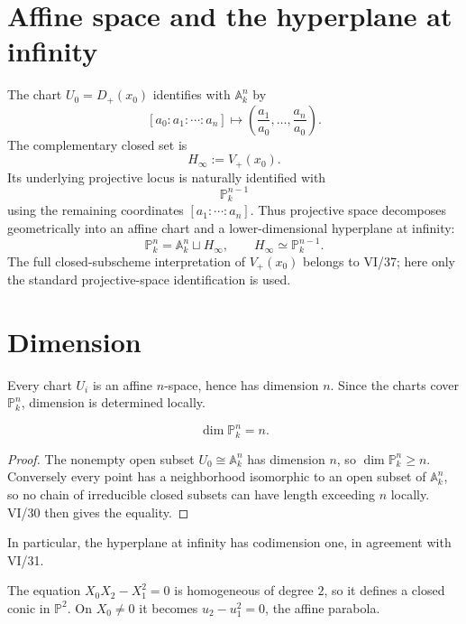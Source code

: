 \section{Affine space and the hyperplane at infinity}
The chart \(U_0=D_+(x_0)\) identifies with \(\mathbb A^n_k\) by
\[
[a_0:a_1:\cdots:a_n]\longmapsto
\left(\frac{a_1}{a_0},\ldots,\frac{a_n}{a_0}\right).
\]
The complementary closed set is
\[
H_\infty:=V_+(x_0).
\]
Its underlying projective locus is naturally identified with
\[
\mathbb P^{n-1}_k
\]
using the remaining coordinates \([a_1:\cdots:a_n]\).  Thus projective space decomposes geometrically into an affine chart and a lower-dimensional hyperplane at infinity:
\[
\boxed{\mathbb P^n_k=\mathbb A^n_k\sqcup H_\infty,\qquad H_\infty\simeq\mathbb P^{n-1}_k.}
\]
The full closed-subscheme interpretation of \(V_+(x_0)\) belongs to VI/37; here only the standard projective-space identification is used.



\section{Dimension}
Every chart \(U_i\) is an affine \(n\)-space, hence has dimension \(n\).  Since the charts cover \(\mathbb P^n_k\), dimension is determined locally.

\begin{theorem}\label{thm:vi36-dimension}
\[
\boxed{\dim\mathbb P^n_k=n.}
\]
\end{theorem}

\begin{proof}
The nonempty open subset \(U_0\cong\mathbb A^n_k\) has dimension \(n\), so \(\dim\mathbb P^n_k\ge n\).  Conversely every point has a neighborhood isomorphic to an open subset of \(\mathbb A^n_k\), so no chain of irreducible closed subsets can have length exceeding \(n\) locally.  VI/30 then gives the equality.
\end{proof}

In particular, the hyperplane at infinity has codimension one, in agreement with VI/31.

\begin{example}\label{ex:vi36-expand-02}
The equation $X_0X_2-X_1^2=0$ is homogeneous of degree $2$, so it defines a closed conic in $\mathbb P^2$.  On $X_0\ne0$ it becomes $u_2-u_1^2=0$, the affine parabola.
\end{example}
